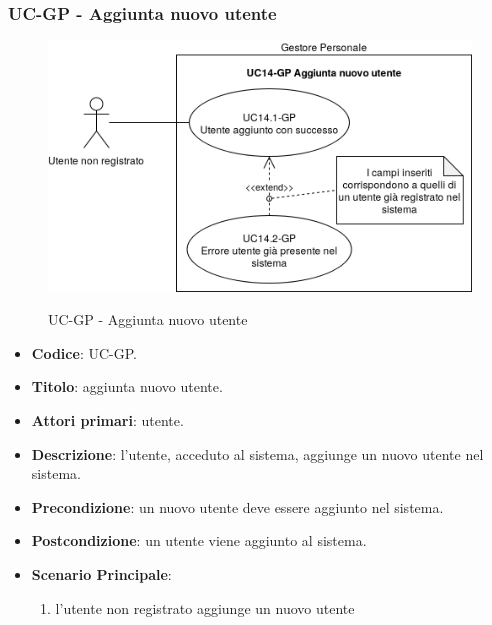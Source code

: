 \subsubsection{UC\theuccount-GP - Aggiunta nuovo utente}
		\begin{figure}[H]
			\centering
				\includegraphics[width=\columnwidth]{img/casi_d'uso/UC14.png}\\
			\caption{UC\theuccount-GP - Aggiunta nuovo utente}
		\end{figure}
	\begin{itemize}
		\item \textbf{Codice}: UC\theuccount-GP.
		\item \textbf{Titolo}: aggiunta nuovo utente.
		\item \textbf{Attori primari}: utente.
		\item \textbf{Descrizione}: l'utente, acceduto al sistema, aggiunge un nuovo utente nel sistema.
		\item \textbf{Precondizione}: un nuovo utente deve essere aggiunto nel sistema.
		\item \textbf{Postcondizione}: un utente viene aggiunto al sistema.
		\item \textbf{Scenario Principale}:
		\begin{enumerate}
			\item l'utente non registrato aggiunge un nuovo utente
		\end{enumerate}
	\end{itemize}

